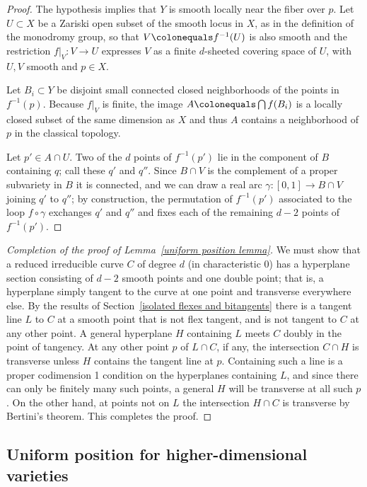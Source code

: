 \begin{proof}
The hypothesis implies that $Y$ is smooth
locally near the fiber over $p$. Let $U \subset X$ be a Zariski open
subset of the smooth locus in $X$, as in the definition of the monodromy
group, so that  $V \colonequals  f^{-1}(U)$ is also smooth and the
restriction $f|_V : V \to U$ expresses $V$ as a finite $d$-sheeted
covering space of $U$, with $U,V$ smooth and $p\in X$.

Let $B_i\subset Y$ be disjoint small connected closed neighborhoods of
the points
in $f^{-1}(p)$. Because $f|_V$  is finite, the image $A \colonequals
\bigcap f(B_i)$  is a locally
closed subset of the same dimension as $X$ and thus $A$
 contains a neighborhood
of $p$ in the classical topology.

Let $p' \in A \cap U$. Two of the $d$ points of $f^{-1}(p')$  lie in the
component  of $B$ containing $q$; call these $q'$ and $q''$. Since $B
\cap V$ is the complement of a proper subvariety in $B$ it is connected,
and we can draw a real arc $\gamma : [0,1] \to B \cap V$ joining $q'$
to $q''$; by construction, the permutation of $f^{-1}(p')$ associated
to the loop $f \circ \gamma$  exchanges $q'$ and $q''$ and
fixes
each
of the remaining $d-2$ points of $f^{-1}(p')$.
\end{proof}

\begin{proof}[Completion of the proof of
Lemma~\ref{uniform position lemma}]
We  must show
that
a reduced irreducible curve $C$ of degree $d$
 (in characteristic 0)
 has a hyperplane section consisting of $d-2$ smooth points and one
 double point; that is, a hyperplane simply tangent to the curve at one
 point and transverse everywhere else. By the results of
 Section~\ref{isolated flexes and bitangents} there is a tangent line $L$
 to $C$ at a smooth point that is not flex tangent, and is not tangent
 to $C$ at any other point. A general hyperplane $H$ containing $L$
 meets $C$ doubly in the point of
 tangency. At any other point $p$ of $L\cap C$, if any, the intersection
 $C\cap H$ is transverse
 unless $H$ contains the tangent line at $p$. Containing such a line is
 a  proper codimension 1 condition on
 the hyperplanes containing $L$, and since there can only be finitely
 many such points, a
 general  $H$ will be transverse at all such $p$. On the other hand,
 at points not on $L$
 the intersection $H\cap C$ is transverse by Bertini's theorem. This
 completes the proof.
\end{proof}

\subsection*{Uniform position for higher-dimensional varieties}

